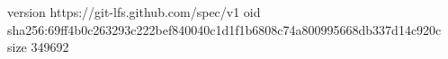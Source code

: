 version https://git-lfs.github.com/spec/v1
oid sha256:69ff4b0c263293c222bef840040c1d1f1b6808c74a800995668db337d14c920c
size 349692
